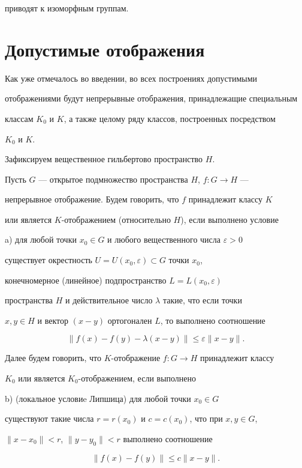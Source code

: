 приводят к изоморфным группам. 


 


\section{Допустимые отображения} 


 


Как уже отмечалось во введении, во всех построениях допустимыми 


отображениями будут непрерывные отображения, принадлежащие специальным 


классам $K_0$ и $K$, а также целому ряду классов, построенных посредством 


$K_0$ и $K$. 


 


Зафиксируем вещественное гильбертово пространство $H$. 


 


\begin{defn} 


Пусть $G$ --- открытое подмножество пространства $H$, $f:G\to H$ --- 


непрерывное отображение. Будем говорить, что $f$ принадлежит классу $K$ 


или является $K$-отображением (относительно $H$), если выполнено условие 


 


a) для любой точки $x_0\in G$ и любого вещественного числа $\varepsilon>0$ 


существует окрестность $U=U(x_0,\varepsilon)\subset G$ точки $x_0$, 


конечномерное (линейное) подпространство $L=L(x_0,\varepsilon)$ 


пространства $H$ и действительное число $\lambda$ такие, что если точки 


$x,y\in H$ и вектор $(x-y)$ ортогонален $L$, то выполнено соотношение 


$$ 


\|f(x)-f(y)-\lambda(x-y)\|\le\varepsilon\|x-y\|. 


$$ 


Далее будем говорить, что $K$-отображение $f:G\to H$ принадлежит классу 


$K_0$ или является $K_0$-отображением, если выполнено


 


b) (локальное условиe Липшица) для любой точки $x_0\in G$ 


существуют такие числа $r=r(x_0)$ и $c=c(x_0)$, что при $x,y\in G$, 


$\|x-x_0\|<r$, $\|y-y_0\|<r$ выполнено соотношение 


$$ 


\|f(x)-f(y)\|\le c\|x-y\|. 


$$ 


\end{defn} 


